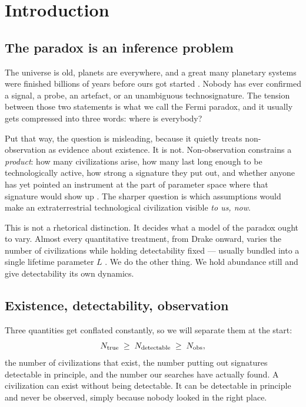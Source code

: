 \section{Introduction}
\label{sec:intro}

\subsection{The paradox is an inference problem}

The universe is old, planets are everywhere, and a great many planetary systems
were finished billions of years before ours got started
\citep{lineweaver2001,borucki2016}. Nobody has ever confirmed a signal, a probe,
an artefact, or an unambiguous technosignature. The tension between those two
statements is what we call the Fermi paradox, and it usually gets compressed
into three words: where is everybody? \citep{hart1975,brin1983silence,webb2015}

Put that way, the question is misleading, because it quietly treats
non-observation as evidence about existence. It is not. Non-observation
constrains a \emph{product}: how many civilizations arise, how many last long
enough to be technologically active, how strong a signature they put out, and
whether anyone has yet pointed an instrument at the part of parameter space
where that signature would show up \citep{gray2015,tarter2001,sheikh2020}. The
sharper question is which assumptions would make an extraterrestrial
technological civilization visible \emph{to us, now}.

This is not a rhetorical distinction. It decides what a model of the paradox
ought to vary. Almost every quantitative treatment, from Drake onward, varies
the number of civilizations while holding detectability fixed --- usually
bundled into a single lifetime parameter $L$ \citep{prantzos2013,prantzos2020}.
We do the other thing. We hold abundance still and give detectability its own
dynamics.

\subsection{Existence, detectability, observation}

Three quantities get conflated constantly, so we will separate them at the
start:
\begin{equation}
  N_{\mathrm{true}} \;\geq\; N_{\mathrm{detectable}} \;\geq\; N_{\mathrm{obs}} ,
  \label{eq:threeN}
\end{equation}
the number of civilizations that exist, the number putting out signatures
detectable in principle, and the number our searches have actually found. A
civilization can exist without being detectable. It can be detectable in
principle and never be observed, simply because nobody looked in the right
place. \Established

